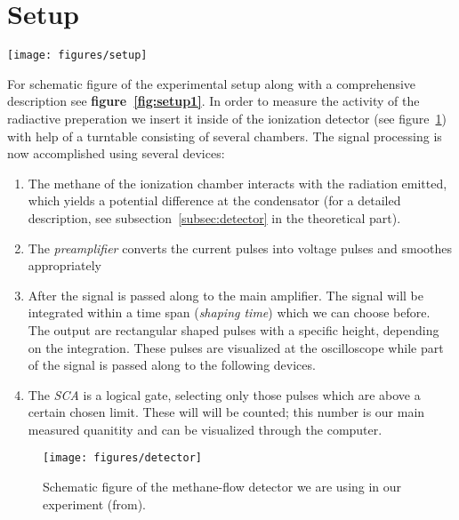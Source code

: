 \clearpage
\section{Setup}
\label{sec:setup}

\begin{SCfigure}
    \centering
    \caption{Schematic figure of the experimental setup. The
    signal processing is as following: The ionization detector
    (for a detailed description, see subsection~\ref{subsec:detector} 
    in the theoretical part) detects a potential difference within its
    condensator, passing the signal to the preamplifier (the preamplifier
    functions at the same time as a gateway of the high voltage providing
    the ionization detector). The preamplifier passes the signal to the
    main amplifier. At this point, the signal will be split and passed along
    both to the single channel analyzer (SCA) and the oscilloscope. This setup
    allows to calibrate the amplifier and the SCA depending on different
    signal strengths.
    }
    \texttt{[image: figures/setup]}
    \label{fig:setup1}
\end{SCfigure}

For schematic figure of the experimental setup along with a comprehensive
description see \textbf{figure~\ref{fig:setup1}}. In order to measure the activity of
the radiactive preperation we insert it inside of the ionization detector (see figure~\ref{fig:detector}) with
help of a turntable consisting of several chambers. The signal processing is now
accomplished using several devices: 
\begin{enumerate}
\item The methane of the ionization chamber 
interacts with the radiation emitted, which yields a potential difference
at the condensator (for a detailed description, 
see subsection~\ref{subsec:detector}
in the theoretical part).
\item The \textit{preamplifier} converts the current pulses into voltage pulses
and smoothes appropriately
\item After the signal is passed along to the main amplifier. The signal
will be integrated within a time span (\textit{shaping time}) which we can
choose before. The output are rectangular shaped pulses with a specific 
height, depending on the integration. These pulses are visualized at the
oscilloscope while part of the signal is passed along to the following devices.
\item The \textit{SCA} is a logical gate, selecting only those pulses which
are above a certain chosen limit. These will will be counted; this number is
our main measured quanitity and can be visualized through the computer.
\end{enumerate}
\begin{figure}[H]
    \centering
    \texttt{[image: figures/detector]}
    \caption{Schematic figure of the methane-flow detector we are using in our experiment (from\cite{ver}).
    }
    \label{fig:detector}
\end{figure}

